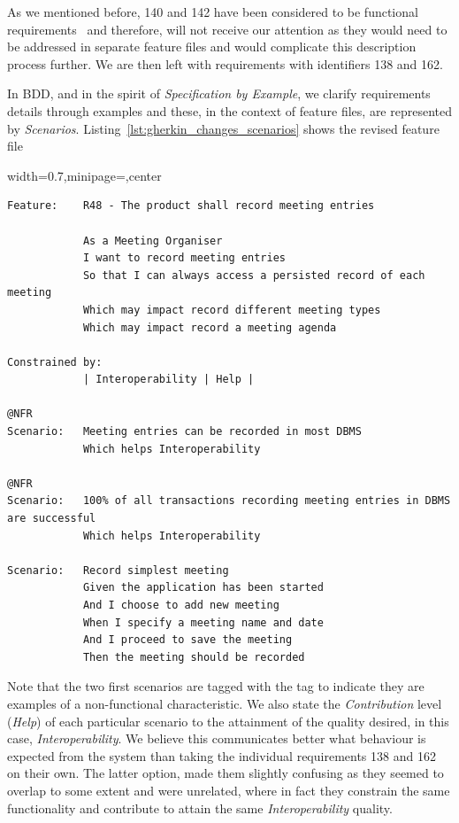 \documentclass[dissertation,final]{softeng}
\newenvironment{featurecode}[1]
{ \lrbox\featurebox \begin{adjustbox}{width=#1\textwidth,minipage=\textwidth,center} }
{ \end{adjustbox}\endlrbox}
\newenvironment{featurelist}[2]
{
\newcommand{\setcaption}{\caption{#1}}
\newcommand{\setlabel}{\label{#2}}
}
{\begin{listing}[h!]\centering\usebox\featurebox\setcaption\setlabel\end{listing}}
\begin{document}
As we mentioned before, 140 and 142 have been considered to be functional requirements~\citep{MylopoulosOnt2014} and therefore, will not receive our attention as they would need to be addressed in separate feature files and would complicate this description process further. We are then left with requirements with identifiers 138 and 162.

In BDD, and in the spirit of \emph{Specification by Example}, we clarify requirements details through examples and these, in the context of feature files, are represented by \emph{Scenarios}. Listing~\ref{lst:gherkin_changes_scenarios} shows the revised feature file

\begin{featurelist}{Changes to Gherkin -- Scenarios}{lst:gherkin_changes_scenarios}
\begin{featurecode}{0.7}
\begin{verbatim}
Feature:    R48 - The product shall record meeting entries

            As a Meeting Organiser
            I want to record meeting entries
            So that I can always access a persisted record of each meeting
            Which may impact record different meeting types
            Which may impact record a meeting agenda
	
Constrained by:
            | Interoperability | Help |

@NFR
Scenario:   Meeting entries can be recorded in most DBMS
            Which helps Interoperability

@NFR	
Scenario:   100% of all transactions recording meeting entries in DBMS are successful
            Which helps Interoperability

Scenario:   Record simplest meeting
            Given the application has been started
            And I choose to add new meeting
            When I specify a meeting name and date
            And I proceed to save the meeting
            Then the meeting should be recorded
\end{verbatim}
\end{featurecode}
\end{featurelist}

Note that the two first scenarios are tagged with the tag \emph{\@NFR} to indicate they are examples of a non-functional characteristic. We also state the \emph{Contribution} level (\emph{Help}) of each particular scenario to the attainment of the quality desired, in this case, \emph{Interoperability}. We believe this communicates better what behaviour is expected from the system than taking the individual requirements 138 and 162 on their own. The latter option, made them slightly confusing as they seemed to overlap to some extent and were unrelated, where in fact they constrain the same functionality and contribute to attain the same \emph{Interoperability} quality.
\end{document}
